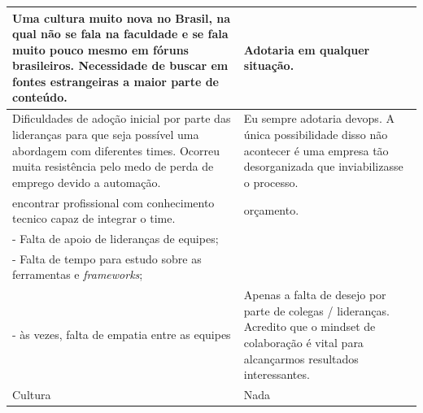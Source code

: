 \documentclass[twoside,english,brazilian]{UNISINOSartigo}
\begin{document}
\begin{table}[h]
\begin{tabularx}{\columnwidth}{XX}
       Uma   cultura muito nova no Brasil, na qual não se fala na faculdade e se fala   muito pouco mesmo em fóruns brasileiros. Necessidade de buscar em fontes   estrangeiras a maior parte de conteúdo.                                                                                                                         &    Adotaria   em qualquer situação.                                                                                                                         \\ \hline
       Dificuldades   de adoção inicial por parte das lideranças para que seja possível uma   abordagem com diferentes times. Ocorreu muita resistência pelo medo de perda   de emprego devido a automação.                                                                                                                        &    Eu   sempre adotaria devops. A única possibilidade disso não acontecer é uma   empresa tão desorganizada que inviabilizasse o processo.                  \\ \hline
       encontrar   profissional com conhecimento tecnico capaz de integrar o time.                                                                                                                                                                                                                                                 &    orçamento.                                                                                                                                               \\ \hline
       - Falta   de apoio de lideranças de equipes;\\     - Falta de tempo para estudo sobre as ferramentas e \textit{frameworks};\\     - às vezes, falta de empatia entre as equipes                                                                                                                                                      &    Apenas a   falta de desejo por parte de colegas / lideranças. Acredito que o mindset de   colaboração é vital para alcançarmos resultados interessantes. \\ \hline
       Cultura                                                                                                                                                                                                                                                                                                                     &    Nada                                                                                                                                                     \\ \hline

\end{tabularx}
\end{table}
\end{document}
